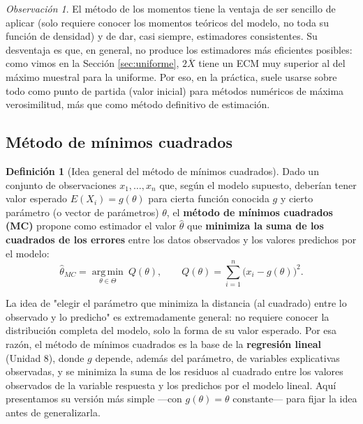 \documentclass[11pt,a4paper]{article}
\theoremstyle{plain}
\theoremstyle{definition}
\newtheorem{definicion}[teorema]{Definición}
\theoremstyle{remark}
\newtheorem{observacion}[teorema]{Observación}
\begin{document}
\begin{observacion}
El método de los momentos tiene la ventaja de ser sencillo de aplicar (solo requiere conocer los momentos teóricos del modelo, no toda su función de densidad) y de dar, casi siempre, estimadores consistentes. Su desventaja es que, en general, no produce los estimadores más eficientes posibles: como vimos en la Sección \ref{sec:uniforme}, $2\overline X$ tiene un ECM muy superior al del máximo muestral para la uniforme. Por eso, en la práctica, suele usarse sobre todo como punto de partida (valor inicial) para métodos numéricos de máxima verosimilitud, más que como método definitivo de estimación.
\end{observacion}

\subsection{Método de mínimos cuadrados}

\begin{definicion}[Idea general del método de mínimos cuadrados]
Dado un conjunto de observaciones $x_1,\dots,x_n$ que, según el modelo supuesto, deberían tener valor esperado $E(X_i)=g(\theta)$ para cierta función conocida $g$ y cierto parámetro (o vector de parámetros) $\theta$, el \textbf{método de mínimos cuadrados (MC)} propone como estimador el valor $\widehat\theta$ que \textbf{minimiza la suma de los cuadrados de los errores} entre los datos observados y los valores predichos por el modelo:
\[
\widehat\theta_{MC} = \operatorname*{arg\,min}_{\theta\in\Theta} \ Q(\theta), \qquad Q(\theta) = \sum_{i=1}^n \big(x_i-g(\theta)\big)^2.
\]
\end{definicion}

La idea de "elegir el parámetro que minimiza la distancia (al cuadrado) entre lo observado y lo predicho" es extremadamente general: no requiere conocer la distribución completa del modelo, solo la forma de su valor esperado. Por esa razón, el método de mínimos cuadrados es la base de la \textbf{regresión lineal} (Unidad 8), donde $g$ depende, además del parámetro, de variables explicativas observadas, y se minimiza la suma de los residuos al cuadrado entre los valores observados de la variable respuesta y los predichos por el modelo lineal. Aquí presentamos su versión más simple —con $g(\theta)=\theta$ constante— para fijar la idea antes de generalizarla.
\end{document}
